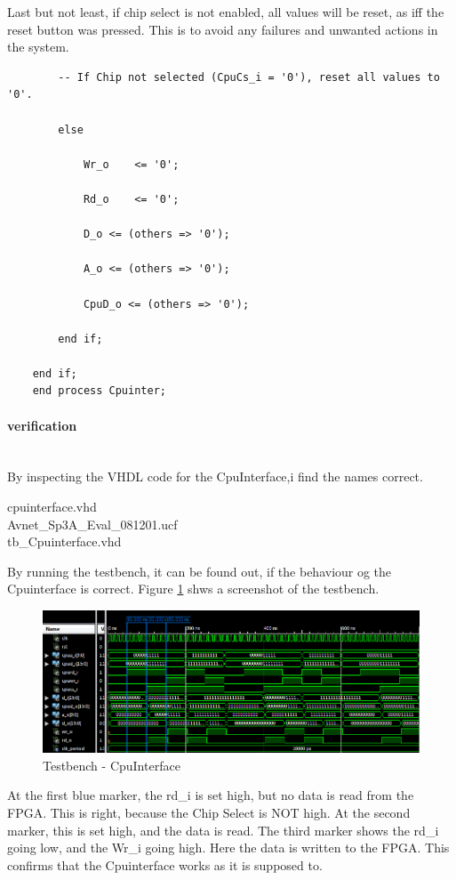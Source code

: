 Last but not least, if chip select is not enabled, all values will be reset, as iff the reset button was pressed. This is to avoid any failures and unwanted actions in the system. 
\begin{verbatim}
		-- If Chip not selected (CpuCs_i = '0'), reset all values to '0'.

		else 

			Wr_o	<= '0';

			Rd_o 	<= '0';

			D_o	<= (others => '0');

			A_o	<= (others => '0');

			CpuD_o <= (others => '0');

		end if;

	end if;
	end process Cpuinter;
\end{verbatim}

\paragraph{verification}\mbox{}\\

By inspecting the VHDL code for the CpuInterface,i find the names correct.\\
\begin{centering}

cpuinterface.vhd\\
Avnet\_Sp3A\_Eval\_081201.ucf\\
tb\_Cpuinterface.vhd

\end{centering}
By running the testbench, it can be found out, if the behaviour og the Cpuinterface is correct. Figure \ref{fig:tb_CpuInterface} shws a screenshot of the testbench. 
\begin{figure}[htbp]
\centering
\includegraphics[width=\textwidth]{./img/tb_CpuInterface}
\caption{Testbench - CpuInterface}
\label{fig:tb_CpuInterface}
\end{figure}

At the first blue marker, the rd\_i is set high, but no data is read from the FPGA. This is right, because the Chip Select is NOT high. At the second marker, this is set high, and the data is read. The third marker shows the rd\_i going low, and the Wr\_i going high. Here the data is written to the FPGA. This confirms that the Cpuinterface works as it is supposed to. 


